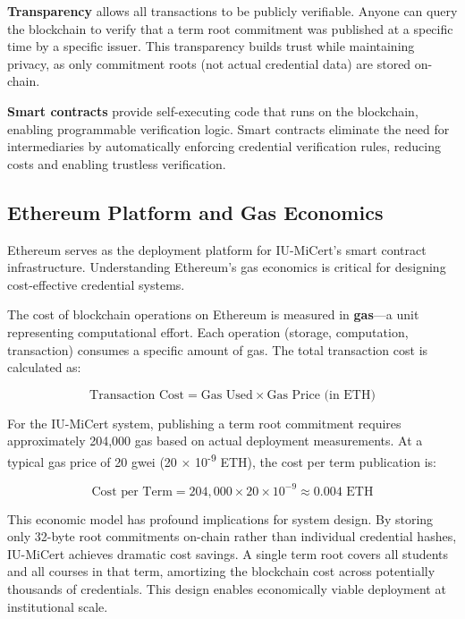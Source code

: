 \textbf{Transparency} allows all transactions to be publicly verifiable. Anyone can query the blockchain to verify that a term root commitment was published at a specific time by a specific issuer. This transparency builds trust while maintaining privacy, as only commitment roots (not actual credential data) are stored on-chain.

\textbf{Smart contracts} provide self-executing code that runs on the blockchain, enabling programmable verification logic. Smart contracts eliminate the need for intermediaries by automatically enforcing credential verification rules, reducing costs and enabling trustless verification.

\subsection{Ethereum Platform and Gas Economics}
\label{subsec:ethereum}

Ethereum serves as the deployment platform for IU-MiCert's smart contract infrastructure. Understanding Ethereum's gas economics is critical for designing cost-effective credential systems.

The cost of blockchain operations on Ethereum is measured in \textbf{gas}—a unit representing computational effort. Each operation (storage, computation, transaction) consumes a specific amount of gas. The total transaction cost is calculated as:

\begin{equation}
\text{Transaction Cost} = \text{Gas Used} \times \text{Gas Price (in ETH)}
\end{equation}

For the IU-MiCert system, publishing a term root commitment requires approximately 204,000 gas based on actual deployment measurements. At a typical gas price of 20 gwei (20 × 10\textsuperscript{-9} ETH), the cost per term publication is:

\begin{equation}
\text{Cost per Term} = 204,000 \times 20 \times 10^{-9} \approx 0.004 \text{ ETH}
\end{equation}

This economic model has profound implications for system design. By storing only 32-byte root commitments on-chain rather than individual credential hashes, IU-MiCert achieves dramatic cost savings. A single term root covers all students and all courses in that term, amortizing the blockchain cost across potentially thousands of credentials. This design enables economically viable deployment at institutional scale.

